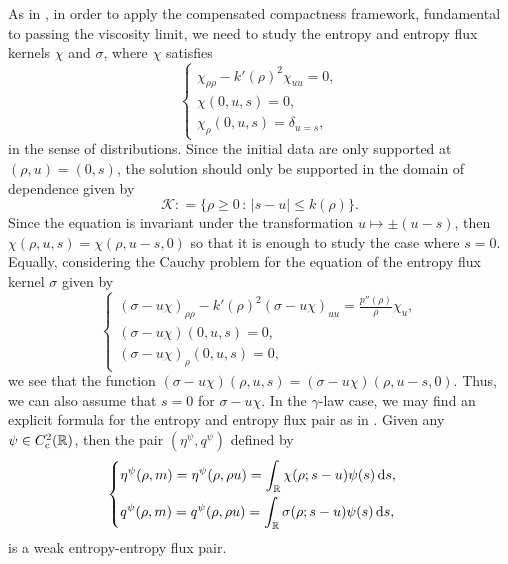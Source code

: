 \documentclass[reqno,11pt]{amsart}
\numberwithin{equation}{section}
\theoremstyle{definition}
\def\r{\rho}
\def\dd{{\, \rm d}}
\begin{document}
    As in \cite{Chen_2000,Chen_2003,Chen_2024}, in order to apply the compensated compactness framework, fundamental to passing the viscosity limit, we need to study the entropy and entropy flux kernels 
    $\chi$ and $\sigma$, where $\chi$ satisfies
    \begin{equation}\label{entropy}
      \begin{cases}
 \chi_{\rho \rho} - k'(\rho)^2 \chi_{u u} = 0, \\
    \chi(0,u,s) = 0, \\
 \chi_\rho(0,u,s) = \delta_{u=s},
     \end{cases}
    \end{equation}
    in the sense of distributions. 
    Since the initial data are only supported at $(\rho,u) = (0,s)$, 
    the solution should only be supported in the domain of dependence given by
    \[
    \mathcal{K} : = \{ \rho \geq 0 \, : \, |s-u| \leq k(\rho) \}.
    \]
   Since the equation is invariant under the transformation $u \mapsto \pm (u - s)$, 
   then $\chi(\rho,u,s) = \chi(\rho,u-s,0)$ so that it is enough to study the case where $s=0$. 
   Equally, considering the Cauchy problem for the equation of
   the entropy flux kernel $\sigma$ given by
    \begin{equation*}
 \begin{cases}
     (\sigma -u \chi)_{\rho \rho} - k'(\rho)^2 (\sigma -u \chi)_{u u} = \frac{p''(\rho)}{\rho} \chi_u, \\
     (\sigma -u \chi)(0,u,s) = 0, \\
      (\sigma -u \chi)_\rho(0,u,s) = 0,
\end{cases}
    \end{equation*}
we see that the function $(\sigma - u \chi)(\rho,u,s) = (\sigma - u \chi)(\rho,u - s,0)$. 
Thus, we can also assume that $s = 0$ for $\sigma - u \chi$. In the $\gamma$-law case, we may find an explicit formula for the entropy and entropy flux pair as in \cite{Chen2021}. 
Given any $\psi \in C^2_{\rm c}(\mathbb{R})$, then the pair $(\eta^\psi,q^\psi)$ defined by
    \begin{align}\label{5.10}
	\begin{cases}
  \displaystyle
\eta^\psi(\rho,m) = \eta^\psi(\rho,\rho u) = \int_\mathbb{R} \chi(\rho;s-u) \psi(s) \dd s,\\[3mm]
  \displaystyle
	  q^\psi(\r,m) = q^\psi(\r, \r u) = \int_\mathbb{R} \sigma(\rho;s-u) \psi(s) \dd s,
	\end{cases}
\end{align}
is a weak entropy-entropy flux pair. 
\end{document}
